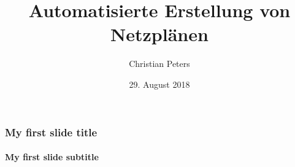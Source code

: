 \documentclass[ngerman, t]{beamer}
\title{Automatisierte Erstellung von Netzpl\"anen}
\author{Christian Peters}
\institute{Institut f\"ur Kernphysik}
\date{29. August 2018}
\begin{document}
\maketitle

\begin{frame}
  \frametitle{My first slide title}
  \framesubtitle{My first slide subtitle}
\end{frame}
\end{document}
